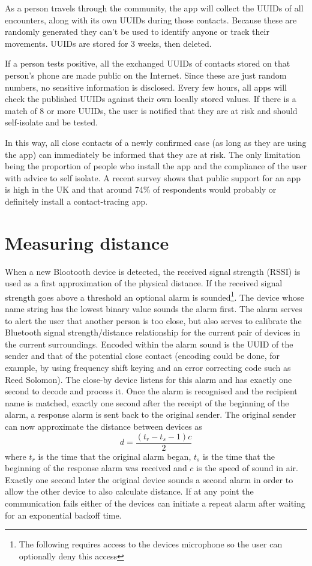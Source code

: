 \documentclass{article}
\begin{document}
As a person travels through the community, the app will collect the UUIDs of all encounters, along with its own UUIDs during those contacts. Because these are randomly generated they can't be used to identify anyone or track their movements. UUIDs are stored for 3 weeks, then deleted.

If a person tests positive, all the exchanged UUIDs of contacts stored on that person's phone are made public on the Internet. Since these are just random numbers, no sensitive information is disclosed. Every few hours, all apps will check the published UUIDs against their own locally stored values. If there is a match of 8 or more UUIDs, the user is notified that they are at risk and should self-isolate and be tested.

In this way, all close contacts of a newly confirmed case (as long as they are using the app) can immediately be informed that they are at risk. The only limitation being the proportion of people who install the app and the compliance of the user with advice to self isolate. A recent survey\cite{abeler2020Support} shows that public support for an app is high in the UK and that around 74\% of respondents would probably or definitely install a contact-tracing app.

\section{Measuring distance}

When a new Blootooth device is detected, the received signal strength (RSSI) is used as a first approximation of the physical distance. If the received signal strength goes above a threshold an optional alarm is sounded\footnote{The following requires access to the devices microphone so the user can optionally deny this access}. The device whose name string has the lowest binary value sounds the alarm first. The alarm serves to alert the user that another person is too close, but also serves to calibrate the Bluetooth signal strength/distance relationship for the current pair of devices in the current surroundings. Encoded within the alarm sound is the UUID of the sender and that of the potential close contact (encoding could be done, for example, by using frequency shift keying and an error correcting code such as Reed Solomon). The close-by device listens for this alarm and has exactly one second to decode and process it. Once the alarm is recognised and the recipient name is matched, exactly one second after the receipt of the beginning of the alarm, a response alarm is sent back to the original sender. The original sender can now approximate the distance between devices as
\[
d = \frac{(t_r - t_s - 1)c}{2}
\]
where $t_r$ is the time that the original alarm began, $t_s$ is the time that the beginning of the response alarm was received and $c$ is the speed of sound in air. Exactly one second later the original device sounds a second alarm in order to allow the other device to also calculate distance. If at any point the communication fails either of the devices can initiate a repeat alarm after waiting for an exponential backoff time. 
\end{document}
